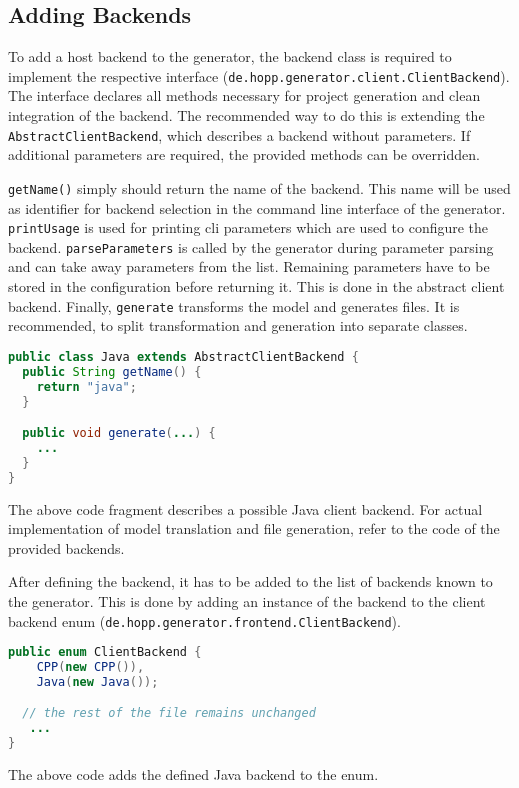 \documentclass{report}
\begin{document}
\subsection{Adding Backends}
To add a host backend to the generator, the backend class is required to implement the respective interface (\texttt{de.hopp.generator.client.ClientBackend}). The interface declares all methods necessary for project generation and clean integration of the backend. The recommended way to do this is extending the \texttt{AbstractClientBackend}, which describes a backend without parameters. If additional parameters are required, the provided methods can be overridden.

\texttt{getName()} simply should return the name of the backend. This name will be used as identifier for backend selection in the command line interface of the generator. \texttt{printUsage} is used for printing cli parameters which are used to configure the backend. \texttt{parseParameters} is called by the generator during parameter parsing and can take away parameters from the list. Remaining parameters have to be stored in the configuration before returning it. This is done in the abstract client backend. Finally, \texttt{generate} transforms the model and generates files. It is recommended, to split transformation and generation into separate classes.

\begin{lstlisting}[language=java]
public class Java extends AbstractClientBackend {
  public String getName() {
    return "java";
  }

  public void generate(...) {
    ...
  }
}
\end{lstlisting}

The above code fragment describes a possible Java client backend. For actual implementation of model translation and file generation, refer to the code of the provided backends.

After defining the backend, it has to be added to the list of backends known to the generator. This is done by adding an instance of the backend to the client backend enum (\texttt{de.hopp.generator.frontend.ClientBackend}).

\begin{lstlisting}[language=java]
public enum ClientBackend {
    CPP(new CPP()),
    Java(new Java());

  // the rest of the file remains unchanged
   ...
}
\end{lstlisting}

The above code adds the defined Java backend to the enum.
\end{document}

